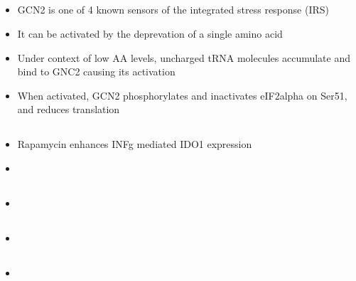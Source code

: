 \documentclass{article}
\begin{document}
    \subsection{\cite{xia2018gcn2}}
    \begin{itemize}
        \item GCN2 is one of 4 known sensors of the integrated stress response (IRS)
        \item It can be activated by the deprevation of a single amino acid
        \item Under context of low AA levels, uncharged tRNA molecules accumulate and bind to GNC2 causing its activation
        \item When activated, GCN2 phosphorylates and inactivates eIF2alpha on Ser51, and reduces translation
    \end{itemize}

    \subsection{\cite{folgiero2016ido1}}
    \begin{itemize}
        \item Rapamycin enhances INFg mediated IDO1 expression
        \item
    \end{itemize}

    \subsection{\cite{}}
    \begin{itemize}
        \item
    \end{itemize}

    \subsection{\cite{}}
    \begin{itemize}
        \item
    \end{itemize}

    \subsection{\cite{}}
    \begin{itemize}
        \item
    \end{itemize}
\end{document}
